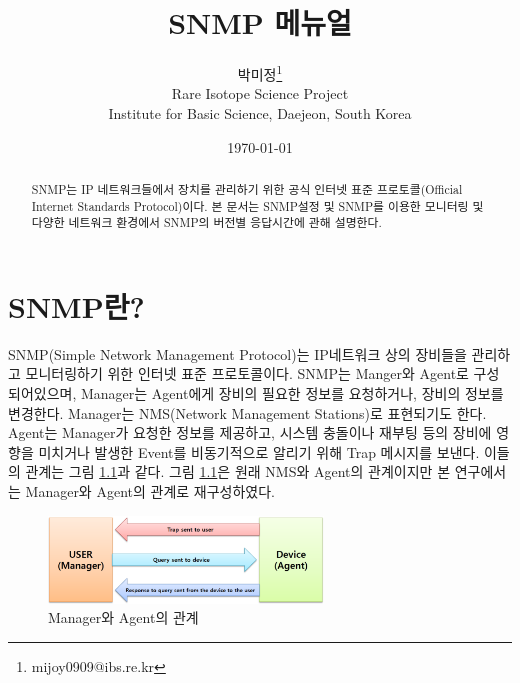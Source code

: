 \documentclass[11pt
  , a4paper
  , article
  , oneside
]{memoir}
\begin{document}
\newcommand{\technumber}{
  RAON Control-Document Series\\
  Revision : v1.0,   Release : Jan. 02. 2015}
\title{\textbf{SNMP 메뉴얼}}

\author{박미정\thanks{mijoy0909@ibs.re.kr} \\

  Rare Isotope Science Project\\
  Institute for Basic Science, Daejeon, South Korea
}
\date{\today}

\renewcommand{\maketitlehooka}{\begin{flushright}\textsf{\technumber}\end{flushright}}

\maketitle

\begin{abstract}
SNMP는 IP 네트워크들에서 장치를 관리하기 위한 공식 인터넷 표준 프로토콜(Official Internet Standards Protocol)\citep{oisp}이다. 본 문서는 SNMP설정 및 SNMP를 이용한 모니터링 및 다양한 네트워크 환경에서 SNMP의 버전별 응답시간에 관해 설명한다. 
\end{abstract}

\chapter{SNMP란?}
SNMP(Simple Network Management Protocol)는 IP네트워크 상의 장비들을 관리하고 모니터링하기 위한 인터넷 표준 프로토콜이다. SNMP는 Manger와 Agent로 구성되어있으며, Manager는 Agent에게 장비의 필요한 정보를 요청하거나, 장비의 정보를 변경한다. Manager는 NMS(Network Management Stations)로 표현되기도 한다. Agent는 Manager가 요청한 정보를 제공하고, 시스템 충돌이나 재부팅 등의 장비에 영향을 미치거나 발생한 Event를 비동기적으로 알리기 위해 Trap 메시지를 보낸다. 이들의 관계는 그림 \ref{fig:relationship_m_a}과 같다. 그림 \ref{fig:relationship_m_a}은 원래 NMS와 Agent의 관계이지만 본 연구에서는 Manager와 Agent의 관계로 재구성하였다.
\begin{figure}[h!]
  \centering
  \includegraphics[width=0.65\textwidth]{./images/relationship_m_a.eps}
  \caption{Manager와 Agent의 관계}
  \label{fig:relationship_m_a}   
\end{figure}
\end{document}
